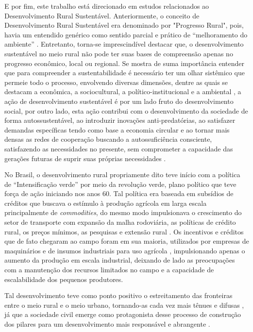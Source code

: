 E por fim, este trabalho está direcionado em estudos relacionados ao Desenvolvimento Rural Sustentável. Anteriormente, o conceito de Desenvolvimento Rural Sustentável era denominado por "Progresso Rural", pois, havia um entendido genérico como sentido parcial e prático de “melhoramento do ambiente” \cite{almeida_da_1995}. Entretanto, torna-se imprescindível destacar que, o desenvolvimento sustentável no meio rural não pode ter suas bases de compreensão apenas no progresso econômico, local ou regional. Se mostra de suma importância entender que para compreender a sustentabilidade é necessário ter um olhar sistêmico que permeie todo o processo, envolvendo diversas dimensões, dentre as quais se destacam a econômica, a sociocultural, a político-institucional e a ambiental \cite{vieira_politica_2015}, a ação de desenvolvimento sustentável é por um lado fruto do desenvolvimento social, por outro lado, esta ação contribui com o desenvolvimento da sociedade de forma autossustentável, ao introduzir inovações anti-predatórias, ao satisfazer demandas específicas tendo como base a economia circular e ao tornar mais densas as redes de cooperação buscando a autossuficiência consciente, satisfazendo as necessidades no presente, sem comprometer a capacidade das gerações futuras de suprir suas próprias necessidades \cite{onu_sustainable_2016}.

No Brasil, o desenvolvimento rural propriamente dito teve início com a política de “Intensificação verde” por meio da revolução verde, plano político que teve força de ação iniciando nos anos 60. Tal política era baseada em subsídios de créditos que buscava o estímulo à produção agrícola em larga escala principalmente de \textit{commodities}, do mesmo modo impulsionava o crescimento do setor de transporte com expansão da malha rodoviária, as políticas de crédito rural, os preços mínimos, as pesquisas e extensão rural \cite{kageyama_o_1990}. Os incentivos e créditos que de fato chegaram ao campo foram em sua maioria, utilizados por empresas de maquinários e de insumos industriais para uso agrícola \cite{strassburg_producao_2015}, impulsionando apenas o aumento da produção em escala industrial, deixando de lado as preocupações com a manutenção dos recursos limitados no campo e a capacidade de escalabilidade dos pequenos produtores.

Tal desenvolvimento teve como ponto positivo o estreitamento das fronteiras entre o meio rural e o meio urbano, tornando-as cada vez mais tênues e difusas \cite{freitas_mudancas_2012}, já que a sociedade civil emerge como protagonista desse processo de construção dos pilares para um desenvolvimento mais responsável e abrangente \cite{de_souza_empreendedorismo_2016}. 


